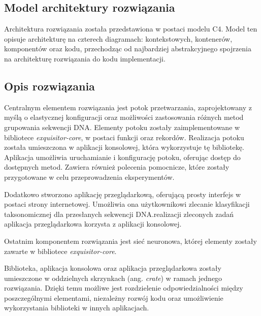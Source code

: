     \subsection{Model architektury rozwiązania}

        Architektura rozwiązania została przedstawiona w postaci modelu C4\cite{C4}. Model ten opisuje architekturę na czterech diagramach: kontekstowych, kontenerów, komponentów oraz kodu, przechodząc od najbardziej abstrakcyjnego spojrzenia na architekturę rozwiązania do kodu implementacji.
            

    \subsection{Opis rozwiązania}

        Centralnym elementem rozwiązania jest potok przetwarzania, zaprojektowany z myślą o elastycznej konfiguracji oraz możliwości zastosowania różnych metod grupowania sekwencji DNA. Elementy potoku zostały zaimplementowane w bibliotece \textit{exquisitor-core}, w postaci funkcji oraz rekordów. Realizacja potoku została umieszczona w aplikacji konsolowej, która wykorzystuje tę bibliotekę. Aplikacja umożliwia uruchamianie i konfigurację potoku, oferując dostęp do dostępnych metod. Zawiera również polecenia pomocnicze, które zostały przygotowane w celu przeprowadzenia eksperymentów.

        Dodatkowo stworzono aplikację przeglądarkową, oferującą prosty interfejs w postaci strony internetowej. Umożliwia ona użytkownikowi zlecanie klasyfikacji taksonomicznej dla przesłanych sekwencji DNA.\@Do realizacji zleconych zadań aplikacja przeglądarkowa korzysta z aplikacji konsolowej.

        Ostatnim komponentem rozwiązania jest sieć neuronowa, której elementy zostały zawarte w bibliotece \textit{exquisitor-core}. 

        Biblioteka, aplikacja konsolowa oraz aplikacja przeglądarkowa zostały umieszczone w oddzielnych skrzynkach (ang. \textit{crate}) w ramach jednego rozwiązania. Dzięki temu możliwe jest rozdzielenie odpowiedzialności między poszczególnymi elementami, niezależny rozwój kodu oraz umożliwienie wykorzystania biblioteki w innych aplikacjach.

